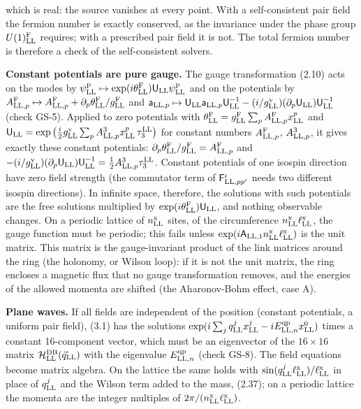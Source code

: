 \documentclass[
  10pt,
]{article}
\begin{document}
which is real: the source vanishes at every point. With a
self-consistent pair field the fermion number is exactly conserved, as
the invariance under the phase group \(U(1)^{\rm F}_{\rm LL}\) requires;
with a prescribed pair field it is not. The total fermion number is
therefore a check of the self-consistent solvers.

\textbf{Constant potentials are pure gauge.} The gauge transformation
(2.10) acts on the modes by
\(\psi^{\rm p}_{\rm LL}\mapsto\exp(i\theta^{\rm F}_{\rm LL})\mathsf U_{\rm LL}\psi^{\rm p}_{\rm LL}\)
and on the potentials by
\(A^{\rm F}_{{\rm LL},p}\mapsto A^{\rm F}_{{\rm LL},p}+\partial_p\theta^{\rm F}_{\rm LL}/g^{\rm F}_{\rm LL}\)
and
\(\mathsf a_{{\rm LL},p}\mapsto\mathsf U_{\rm LL}\mathsf a_{{\rm LL},p}\mathsf U^{-1}_{\rm LL}-(i/g^{\rm v}_{\rm LL})(\partial_p\mathsf U_{\rm LL})\mathsf U^{-1}_{\rm LL}\)
(check GS-5). Applied to zero potentials with
\(\theta^{\rm F}_{\rm LL}=g^{\rm F}_{\rm LL}\sum_pA^{\rm F}_{{\rm LL},p}x^p_{\rm LL}\)
and
\(\mathsf U_{\rm LL}=\exp\big(\tfrac i2g^{\rm v}_{\rm LL}\sum_pA^3_{{\rm LL},p}x^p_{\rm LL}\,\tau^{\rm LL}_3\big)\)
for constant numbers \(A^{\rm F}_{{\rm LL},p}\), \(A^3_{{\rm LL},p}\),
it gives exactly these constant potentials:
\(\partial_p\theta^{\rm F}_{\rm LL}/g^{\rm F}_{\rm LL}=A^{\rm F}_{{\rm LL},p}\)
and
\(-(i/g^{\rm v}_{\rm LL})(\partial_p\mathsf U_{\rm LL})\mathsf U^{-1}_{\rm LL}=\tfrac12A^3_{{\rm LL},p}\tau^{\rm LL}_3\).
Constant potentials of one isospin direction have zero field strength
(the commutator term of \(\mathsf F^\iota_{{\rm LL},pp'}\) needs two
different isospin directions). In infinite space, therefore, the
solutions with such potentials are the free solutions multiplied by
\(\exp(i\theta^{\rm F}_{\rm LL})\mathsf U_{\rm LL}\), and nothing
observable changes. On a periodic lattice of \(n^{\rm x}_{\rm LL}\)
sites, of the circumference \(n^{\rm x}_{\rm LL}\ell^{\rm x}_{\rm LL}\),
the gauge function must be periodic; this fails unless
\(\exp(i\mathsf A_{{\rm LL},1}n^{\rm x}_{\rm LL}\ell^{\rm x}_{\rm LL})\)
is the unit matrix. This matrix is the gauge-invariant product of the
link matrices around the ring (the holonomy, or Wilson loop): if it is
not the unit matrix, the ring encloses a magnetic flux that no gauge
transformation removes, and the energies of the allowed momenta are
shifted (the Aharonov-Bohm effect, case A).

\textbf{Plane waves.} If all fields are independent of the position
(constant potentials, a uniform pair field), (3.1) has the solutions
\(\exp(i\sum_jq^j_{\rm LL}x^j_{\rm LL}-iE^{\rm qp}_{{\rm LL},n}x^0_{\rm LL})\)
times a constant 16-component vector, which must be an eigenvector of
the \(16\times16\) matrix
\(\mathcal H^{\rm DB}_{\rm LL}(\vec q_{\rm LL})\) with the eigenvalue
\(E^{\rm qp}_{{\rm LL},n}\) (check GS-8). The field equations become
matrix algebra. On the lattice the same holds with
\(\sin(q^j_{\rm LL}\ell^{\rm x}_{\rm LL})/\ell^{\rm x}_{\rm LL}\) in
place of \(q^j_{\rm LL}\) and the Wilson term added to the mass, (2.37);
on a periodic lattice the momenta are the integer multiples of
\(2\pi/(n^{\rm x}_{\rm LL}\ell^{\rm x}_{\rm LL})\).
\end{document}
